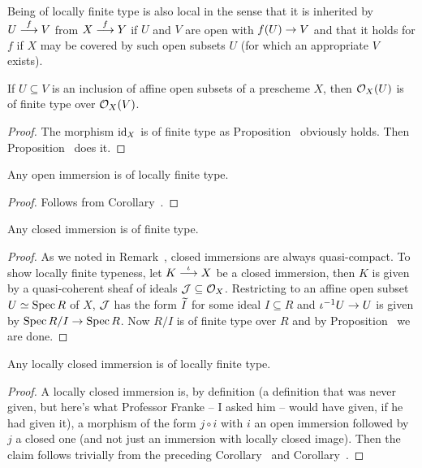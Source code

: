 \documentclass[a4paper,parskip=half,numbers=enddot, DIV=12]{scrreprt}
\begin{document}
\begin{rem*}
    Being of locally finite type is also local in the sense that it is inherited by $U\morphism[f] V$ from $X\morphism[f] Y$ if $U$ and $V$ are open with $f(U)\morphism V$ and that it holds for $f$ if $X$ may be covered by such open subsets $U$ (for which an appropriate $V$ exists).
\end{rem*}
\begin{cor}
    If $U\subseteq V$ is an inclusion of affine open subsets of a prescheme $X$, then $\mathcal{O}_X(U)$ is of finite type over $\mathcal{O}_X(V)$.
\end{cor}
\begin{proof}
	The morphism $\operatorname{id}_X$ is of finite type as Proposition~ obviously holds. Then Proposition~ does it.
\end{proof}
\begin{cor}
    Any open immersion is of locally finite type. 
\end{cor}
\begin{proof}
	Follows from Corollary~.
\end{proof}
\begin{cor}
    Any closed immersion is of finite type.
\end{cor}
\begin{proof}
	As we noted in Remark~, closed immersions are always quasi-compact. To show locally finite typeness, let $K\morphism[\iota]X$ be a closed immersion, then $K$ is given by a quasi-coherent sheaf of ideals $\mathcal{J}\subseteq\mathcal{O}_X$. Restricting to an affine open subset $U\simeq\operatorname{Spec} R$ of $X$, $\mathcal{J}$ has the form $\snake I$ for some ideal $I\subseteq R$ and $\iota^{-1}U\morphism U$ is given by $\Spec R/I\morphism\Spec R$. Now $R/I$ is of finite type over $R$ and by Proposition~ we are done.
\end{proof}
\begin{cor}
    Any locally closed immersion is of locally finite type.
\end{cor}
\begin{proof}
	A locally closed immersion is, by definition (a definition that was never given, but here's what Professor Franke -- I asked him -- would have given, if he had given it), a morphism of the form $j\circ i$ with $i$ an open immersion followed by $j$ a closed one (and not just an immersion with locally closed image). Then the claim follows trivially from the preceding Corollary~ and Corollary~. 
\end{proof}
\end{document}
